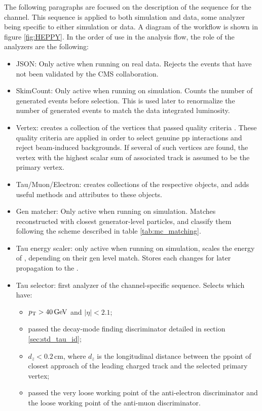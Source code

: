 The following paragraphs are focused on the description of the sequence for the \tauh\tauh channel. This sequence is applied to both simulation and data, some analyzer being specific to either simulation or data. A diagram of the workflow is shown in figure \ref{fig:HEPPY}. In the order of use in the analysis flow, the role of the analyzers are the following:
\begin{itemize}
    \item JSON: Only active when running on real data. Rejects the events that have not been validated by the CMS collaboration.
    \item SkimCount: Only active when running on simulation. Counts the number of generated events before selection. This is used later to renormalize the number of generated events to match the data integrated luminosity.
    \item Vertex: creates a collection of the vertices that passed quality criteria \cite{tracker}. These quality criteria are applied in order to select genuine pp interactions and reject beam-induced backgrounds. If several of such vertices are found, the vertex with the highest scalar sum of associated track \pt is assumed to be the primary vertex.
    \item Tau/Muon/Electron: creates collections of the respective objects, and adds useful methods and attributes to these objects.
    \item Gen matcher: Only active when running on simulation. Matches reconstructed \tauh with closest generator-level particles, and classify them following the scheme described in table \ref{tab:mc_matching}.
    \item Tau energy scaler: only active when running on simulation, scales the energy of \tauh, depending on their gen level match. Stores each changes for later propagation to the \MET.
    \item Tau selector: first analyzer of the channel-specific sequence. Selects \tauh which have:
    \begin{itemize}
    \item $p_{\mathrm{T}} > 40\,\mathrm{GeV}$ and $|\eta| < 2.1$;
    \item passed the decay-mode finding discriminator detailed in section \ref{sec:std_tau_id};
    \item $d_z < 0.2\,\mathrm{cm}$, where $d_z$ is the longitudinal distance between the ppoint of closest approach of the leading charged track and the selected primary vertex;
    \item passed the very loose working point of the anti-electron discriminator and the loose working point of the anti-muon discriminator.

\end{itemize}
\end{itemize}
